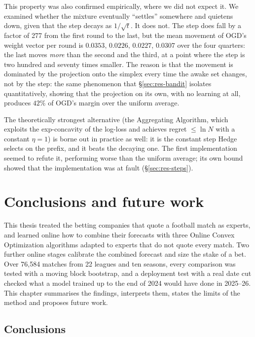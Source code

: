\documentclass[12pt,a4paper,oneside]{report}
\renewcommand{\_}{\oldunderscore\allowbreak}
\theoremstyle{definition}
\theoremstyle{plain}
\theoremstyle{definition}   %
\begin{document}
This property was also confirmed empirically, where we did not expect it. We examined whether the
mixture eventually ``settles'' somewhere and quietens down, given that the step decays as
$1/\sqrt{t}$. It does not. The step does fall by a factor of 277 from the first round to the last,
but the mean movement of OGD's weight vector per round is $0.0353$, $0.0226$, $0.0227$, $0.0307$
over the four quarters: the last moves \emph{more} than the second and the third, at a point where
the step is two hundred and seventy times smaller. The reason is that the movement is dominated by
the projection onto the simplex every time the awake set changes, not by the step: the same
phenomenon that \S\ref{sec:res-bandit} isolates quantitatively, showing that the projection on
its own, with no learning at all, produces $42\%$ of OGD's margin over the uniform average.

The theoretically strongest alternative (the Aggregating Algorithm, which exploits the
exp-concavity of the log-loss and achieves regret $\leq \ln N$ with a constant $\eta=1$) is
borne out in practice as well: it is the constant step Hedge selects on the prefix, and it beats
the decaying one. The first implementation seemed to refute it, performing worse than the
uniform average; its own bound showed that the implementation was at fault
(\S\ref{sec:res-steps}).

\chapter{Conclusions and future work}
\label{ch:conclusion}

This thesis treated the betting companies that quote a football match as experts, and learned
online how to combine their forecasts with three Online Convex Optimization algorithms adapted
to experts that do not quote every match. Two further online stages calibrate the combined
forecast and size the stake of a bet. Over 76,584 matches from 22 leagues and ten seasons, every
comparison was tested with a moving block bootstrap, and a deployment test with a real date cut
checked what a model trained up to the end of 2024 would have done in 2025--26. This chapter
summarises the findings, interprets them, states the limits of the method and proposes future
work.

\section{Conclusions}
\end{document}

